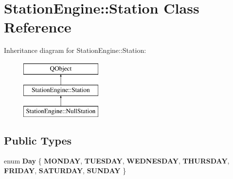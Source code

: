 \hypertarget{classStationEngine_1_1Station}{}\section{Station\+Engine\+:\+:Station Class Reference}
\label{classStationEngine_1_1Station}
Inheritance diagram for Station\+Engine\+:\+:Station\+:\begin{figure}[H]
\begin{center}
\leavevmode
\includegraphics[height=3.000000cm]{classStationEngine_1_1Station}
\end{center}
\end{figure}
\subsection*{Public Types}
\begin{DoxyCompactItemize}
\item 
\mbox{\label{classStationEngine_1_1Station_ac1bf5d8c9bbff48cb22a16ecb070e2ff}} 
enum {\bfseries Day} \{ \newline
{\bfseries M\+O\+N\+D\+AY}, 
{\bfseries T\+U\+E\+S\+D\+AY}, 
{\bfseries W\+E\+D\+N\+E\+S\+D\+AY}, 
{\bfseries T\+H\+U\+R\+S\+D\+AY}, 
\newline
{\bfseries F\+R\+I\+D\+AY}, 
{\bfseries S\+A\+T\+U\+R\+D\+AY}, 
{\bfseries S\+U\+N\+D\+AY}
 \}
\end{DoxyCompactItemize}
